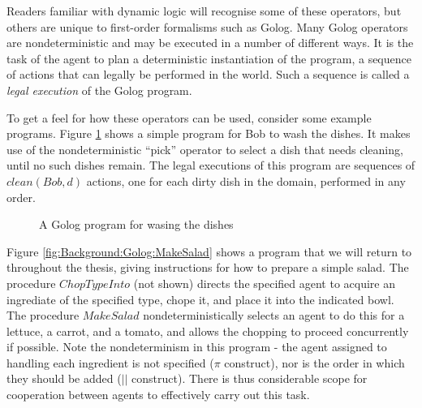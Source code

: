 Readers familiar with dynamic logic will recognise some of these operators,
but others are unique to first-order formalisms such as Golog. Many
Golog operators are nondeterministic and may be executed in a number
of different ways. It is the task of the agent to plan a deterministic
instantiation of the program, a sequence of actions that can legally
be performed in the world. Such a sequence is called a \emph{legal
execution} of the Golog program.

To get a feel for how these operators can be used, consider some example
programs. Figure \ref{fig:Background:Golog:Washing-Dishes} shows
a simple program for Bob to wash the dishes. It makes use of the nondeterministic
{}``pick'' operator to select a dish that needs cleaning, until
no such dishes remain. The legal executions of this program are sequences
of $clean(Bob,d)$ actions, one for each dirty dish in the domain,
performed in any order.

%
\begin{figure}
\begin{centering}
\par\end{centering}

\caption{A Golog program for wasing the dishes\label{fig:Background:Golog:Washing-Dishes}}

\end{figure}


Figure \ref{fig:Background:Golog:MakeSalad} shows a program that
we will return to throughout the thesis, giving instructions for how
to prepare a simple salad. The procedure $ChopTypeInto$ (not shown)
directs the specified agent to acquire an ingrediate of the specified
type, chope it, and place it into the indicated bowl. The procedure
$MakeSalad$ nondeterministically selects an agent to do this for
a lettuce, a carrot, and a tomato, and allows the chopping to proceed
concurrently if possible. Note the nondeterminism in this program
- the agent assigned to handling each ingredient is not specified
($\pi$ construct), nor is the order in which they should be added
($||$ construct). There is thus considerable scope for cooperation
between agents to effectively carry out this task.

